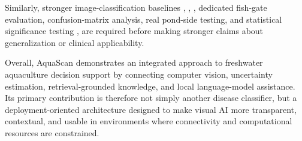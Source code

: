 \documentclass[conference]{IEEEtran}
\begin{document}
Similarly, stronger image-classification baselines \cite{b8}, \cite{b9}, \cite{b10}, dedicated fish-gate evaluation, confusion-matrix analysis, real pond-side testing, and statistical significance testing \cite{b16}, \cite{b19} are required before making stronger claims about generalization or clinical applicability.

Overall, AquaScan demonstrates an integrated approach to freshwater aquaculture decision support by connecting computer vision, uncertainty estimation, retrieval-grounded knowledge, and local language-model assistance. Its primary contribution is therefore not simply another disease classifier, but a deployment-oriented architecture designed to make visual AI more transparent, contextual, and usable in environments where connectivity and computational resources are constrained.





\end{document}
